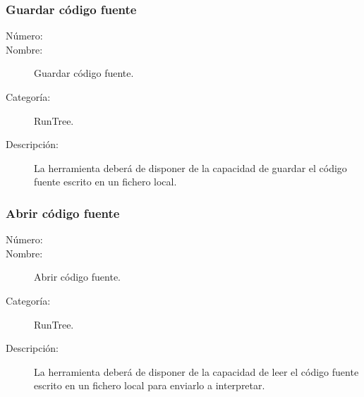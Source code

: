 \subsubsection{Guardar código fuente}
\begin{framed}
	\begin{description}
		\item [Número:] \cn
		\item [Nombre:] Guardar código fuente.
		\item [Categoría:] RunTree.
		\item [Descripción:] La herramienta deberá de disponer de la capacidad de guardar el código fuente escrito en un fichero local.
	\end {description}
\end{framed}

\subsubsection{Abrir código fuente}
\begin{framed}
	\begin{description}
		\item [Número:] \cn
		\item [Nombre:] Abrir código fuente.
		\item [Categoría:] RunTree.
		\item [Descripción:] La herramienta deberá de disponer de la capacidad de leer el código fuente escrito en un fichero local para enviarlo a interpretar.
	\end {description}
\end{framed}
